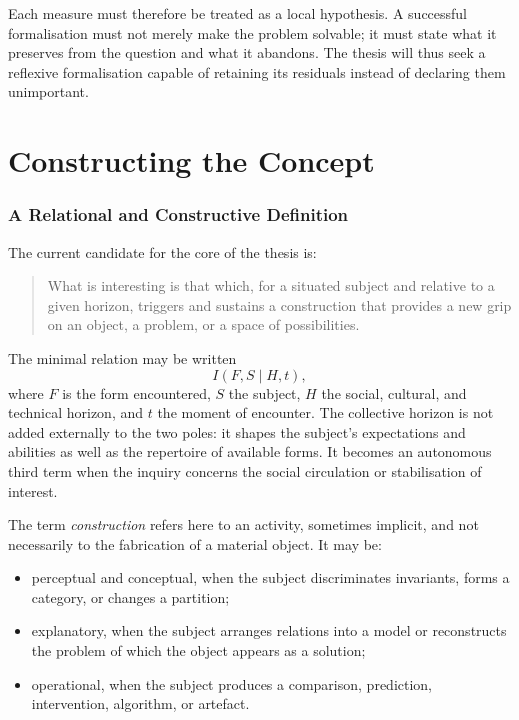 \documentclass[11pt,a4paper]{article}
\begin{document}
Each measure must therefore be treated as a local hypothesis. A successful
formalisation must not merely make the problem solvable; it must state what it
preserves from the question and what it abandons. The thesis will thus seek a
reflexive formalisation capable of retaining its residuals instead of declaring
them unimportant.

\part{Constructing the Concept}

\section{A Relational and Constructive Definition}

The current candidate for the core of the thesis is:

\begin{quote}
What is interesting is that which, for a situated subject and relative to a
given horizon, triggers and sustains a construction that provides a new grip on
an object, a problem, or a space of possibilities.
\end{quote}

The minimal relation may be written
\[
  I(F,S\mid H,t),
\]
where \(F\) is the form encountered, \(S\) the subject, \(H\) the social,
cultural, and technical horizon, and \(t\) the moment of encounter. The
collective horizon is not added externally to the two poles: it shapes the
subject's expectations and abilities as well as the repertoire of available
forms. It becomes an autonomous third term when the inquiry concerns the social
circulation or stabilisation of interest.

The term \emph{construction} refers here to an activity, sometimes implicit, and
not necessarily to the fabrication of a material object. It may be:

\begin{itemize}
  \item perceptual and conceptual, when the subject discriminates invariants,
        forms a category, or changes a partition;
  \item explanatory, when the subject arranges relations into a model or
        reconstructs the problem of which the object appears as a solution;
  \item operational, when the subject produces a comparison, prediction,
        intervention, algorithm, or artefact.
\end{itemize}
\end{document}
